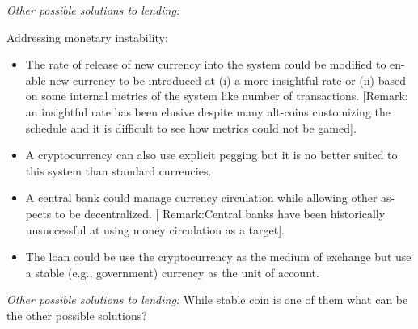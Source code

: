 %
%
%
%
%
%




\textit{Other possible solutions to lending:} ~

Addressing monetary instability:
\begin{itemize}
	\item The rate of release of new currency into the system could be modified to en-
	able new currency to be introduced at (i) a more insightful rate or (ii) based
	on some internal metrics of the system like number of transactions. [Remark:
	an insightful rate has been elusive despite many alt-coins customizing the
	schedule and it is difficult to see how metrics could not be gamed].
	\item A cryptocurrency can also use explicit pegging but it is no better suited to this system than standard currencies.
	\item A central bank could manage currency circulation while allowing other as-
	pects to be decentralized. [	Remark:Central banks have been historically
	unsuccessful at using money circulation as a target].
	\item The loan could be use the cryptocurrency as the medium of exchange but
	use a stable (e.g.,	government) currency as the unit of account.
\end{itemize}

\textit{Other possible solutions to lending:} While stable coin is one of them what can be the other possible solutions?

